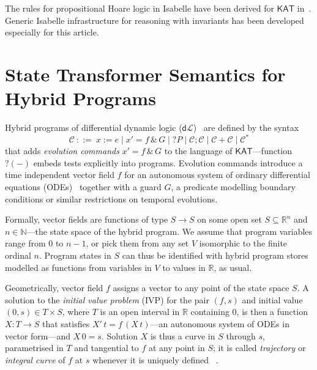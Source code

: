 \documentclass[envcountsame]{llncs}
\newcommand{\KAT}{\mathsf{KAT}}
\newcommand{\dL}{\mathsf{d}\mathcal{L}}
\newcommand{\reals}{\mathbb{R}}
\newcommand\notein[3]{\todo[inline,linecolor=orange!80!black,backgroundcolor=#2!20]{#1: #3}%
}
\newcommand{\gin}[1]{\notein{{\bf GS}}{gcolor}{#1}}
\begin{document}
The rules for propositional Hoare logic in Isabelle have been derived
for $\KAT$ in~\cite{afp:kat,afp:vericomp}. Generic Isabelle
infrastructure for reasoning with invariants has been developed
especially for this article.



\section{State Transformer Semantics for Hybrid
  Programs}\label{sec:sta-hybrid}

\gin{Simon: add some paras on lenses.}

Hybrid programs of differential dynamic logic ($\dL$)~\cite{Platzer18}
are defined by the syntax
\begin{equation*}
\mathcal{C}\ ::= \ x:=e \mid x' = f \, \&\, G \mid ?P\mid \mathcal{C};\mathcal{C}\mid \mathcal{C}+\mathcal{C}\mid \mathcal{C}^*
\end{equation*}
that adds \emph{evolution commands} $x' = f \, \&\, G$ to the language
of $\KAT$---function $?(-)$ embeds tests explicitly into programs.
Evolution commands introduce a time independent vector field $f$ for
an autonomous system of ordinary differential equations
(ODEs)~\cite{Teschl12} together with a guard $G$, a predicate
modelling boundary conditions or similar restrictions on temporal
evolutions. %

Formally, vector fields are functions of type $S\to S$ on some open set
$S\subseteq \reals^n$ and $n\in\mathbb{N}$---the state space of
the hybrid program. We assume that program variables range from $0$ to
$n-1$, or pick them from any set $V$ isomorphic to the finite ordinal
$n$. Program states in $S$ can thus be identified with hybrid program
stores modelled as functions from variables in $V$ to values in
$\reals$, as usual.

Geometrically, vector field $f$ assigns a vector to any point of the
state space
$S$. A solution to the \emph{initial value problem} (IVP) for the pair
$(f,s)$ and initial value $(0,s)\in T\times S$, where $T$ is an open
interval in $\reals$ containing $0$, is then a function $X:T\to S$
that satisfies $X'\, t = f\, (X\, t)$---an autonomous system of ODEs
in vector form---and $X\, 0 = s$. Solution
$X$ is thus a curve in $S$ through $s$, parametrised in $T$ and
tangential to $f$ at any point in $S$; it is called \emph{trajectory}
or \emph{integral curve} of $f$ at $s$ whenever it is uniquely
defined ~\cite{Teschl12}.
\end{document}
